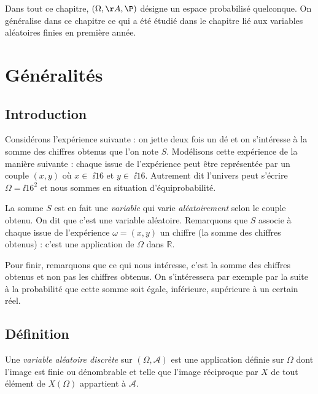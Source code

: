 \documentclass[french,11pt,twoside]{VcCours}
\begin{document}

\tableofcontents
\separationTitre


Dans tout ce chapitre, $(\Omega, \AA, \P)$ désigne un espace probabilisé quelconque. On généralise dans ce chapitre ce qui a été étudié dans le chapitre lié aux variables aléatoires finies en première année.


\section{Généralités}
\subsection{Introduction}

Considérons l'expérience suivante : on jette deux fois un dé et on s'intéresse à la somme des chiffres obtenus que l'on note $S$. Modélisons cette expérience de la manière suivante : chaque issue de l'expérience peut être représentée par un couple $(x,y)$ où $x \in$ $\ii16$ et $y  \in$ $\ii16$. Autrement dit l'univers peut s'écrire $\Omega = \ii16^2$ et nous sommes en situation d'équiprobabilité.
%
%

\vspace{0.2cm}

La somme $S$ est en fait une \og \emph{variable} \fg  qui varie \emph{aléatoirement} selon le couple obtenu. On dit que c'est une variable aléatoire. Remarquons que $S$ associe à chaque issue de l'expérience $\omega=(x,y)$ un chiffre (la somme des chiffres obtenus) : c'est une application de $\Omega$ dans $\mathbb{R}$.

\vspace{0.2cm}

Pour finir, remarquons que ce qui nous intéresse, c'est la somme des chiffres obtenus et non pas les chiffres obtenus. On s'intéressera par exemple par la suite à la probabilité que cette somme soit égale, inférieure, supérieure à un certain réel.

\subsection{Définition}
\begin{Definition}{}
Une \emph{variable aléatoire discrète} sur $(\Omega, \mathcal{A})$ est une application définie sur $\Omega$ dont l'image est finie ou dénombrable et telle que l'image réciproque par $X$ de tout élément de $X(\Omega)$ appartient à $\mathcal{A}$.
\end{Definition}
\end{document}
